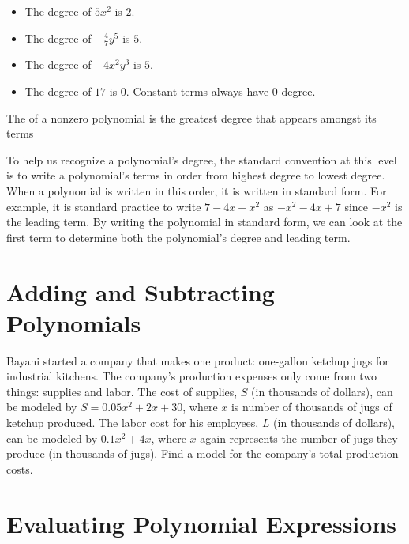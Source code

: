 \documentclass{ximera}
\begin{document}
\begin{example}
  \begin{itemize}
 \item The degree of $5x^2$ is $2$.
\item The degree of $-\frac{4}{7}y^5$ is $5$.
\item     The degree of $-4x^2y^3$ is $5$.
\item  The degree of $17$ is $0$. Constant terms always have $0$ degree.
  \end{itemize}
\end{example}
\begin{definition}
   The  of a nonzero polynomial
          is the greatest degree that appears amongst its terms
\end{definition}
\begin{remark}
   To help us recognize a polynomial's degree,
        the standard convention at this level is to write a polynomial's terms in order from highest degree to lowest degree.
        When a polynomial is written in this order,
        it is written in standard form.
        For example,
        it is standard practice to write $7-4x-x^2$ as
        $-x^2-4x+7$ since $-x^2$ is the leading term.
        By writing the polynomial in standard form,
        we can look at the first term to determine both the polynomial's degree and leading term.
\end{remark}

\section{Adding and Subtracting Polynomials}
        Bayani started a company that makes one product: one-gallon ketchup jugs for industrial kitchens.
        The company's production expenses only come from two things:
        supplies and labor.
        The cost of supplies, $S$
        (in thousands of dollars),
        can be modeled by $S=0.05x^2+2x+30$,
        where $x$ is number of thousands of jugs of ketchup produced.
        The labor cost for his employees, $L$
        (in thousands of dollars),
        can be modeled by $0.1x^2+4x$,
        where $x$ again represents the number of jugs they produce
        (in thousands of jugs).
        Find a model for the company's total production costs.

\section{Evaluating Polynomial Expressions}
\end{document}
